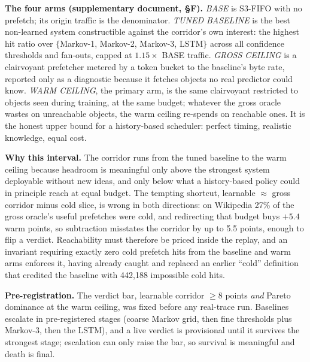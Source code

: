 \documentclass[letterpaper]{article} %
\begin{document}
\textbf{The four arms (supplementary document, \S F).} \emph{BASE} is S3-FIFO with no prefetch; its origin traffic is the denominator. \emph{TUNED BASELINE} is the best non-learned system constructible against the corridor's own interest: the highest hit ratio over $\{$Markov-1, Markov-2, Markov-3, LSTM$\}$ across all confidence thresholds and fan-outs, capped at $1.15\times$ BASE traffic. \emph{GROSS CEILING} is a clairvoyant prefetcher metered by a token bucket to the baseline's byte rate, reported only as a diagnostic because it fetches objects no real predictor could know. \emph{WARM CEILING}, the primary arm, is the same clairvoyant restricted to objects seen during training, at the same budget; whatever the gross oracle wastes on unreachable objects, the warm ceiling re-spends on reachable ones. It is the honest upper bound for a history-based scheduler: perfect timing, realistic knowledge, equal cost.

\textbf{Why this interval.} The corridor runs from the tuned baseline to the warm ceiling because headroom is meaningful only above the strongest system deployable without new ideas, and only below what a history-based policy could in principle reach at equal budget. The tempting shortcut, learnable $\approx$ gross corridor minus cold slice, is wrong in both directions: on Wikipedia 27\% of the gross oracle's useful prefetches were cold, and redirecting that budget buys $+5.4$ warm points, so subtraction misstates the corridor by up to 5.5 points, enough to flip a verdict. Reachability must therefore be priced inside the replay, and an invariant requiring exactly zero cold prefetch hits from the baseline and warm arms enforces it, having already caught and replaced an earlier ``cold'' definition that credited the baseline with 442{,}188 impossible cold hits.

\textbf{Pre-registration.} The verdict bar, learnable corridor $\ge 8$ points \emph{and} Pareto dominance at the warm ceiling, was fixed before any real-trace run. Baselines escalate in pre-registered stages (coarse Markov grid, then fine thresholds plus Markov-3, then the LSTM), and a live verdict is provisional until it survives the strongest stage; escalation can only raise the bar, so survival is meaningful and death is final.
\end{document}

